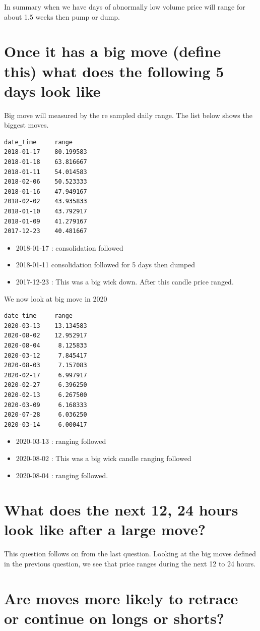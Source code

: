 In summary when we have days of abnormally low volume price will range for about 1.5 weeks then pump or dump.

\section{ Once it has a big move (define this) what does the following 5 days look like}
Big move will measured by the re sampled daily range.
The list below shows the biggest moves.
\begin{verbatim}
date_time     range
2018-01-17    80.199583
2018-01-18    63.816667
2018-01-11    54.014583
2018-02-06    50.523333
2018-01-16    47.949167
2018-02-02    43.935833
2018-01-10    43.792917
2018-01-09    41.279167
2017-12-23    40.481667
\end{verbatim}
\begin{itemize}
\item 2018-01-17 : consolidation followed
\item 2018-01-11 consolidation followed for 5 days then dumped
\item 2017-12-23 : This was a big wick down. After this candle price ranged.
\end{itemize}
We now look at big move in 2020
\begin{verbatim}
date_time     range
2020-03-13    13.134583
2020-08-02    12.952917
2020-08-04     8.125833
2020-03-12     7.845417
2020-08-03     7.157083
2020-02-17     6.997917
2020-02-27     6.396250
2020-02-13     6.267500
2020-03-09     6.168333
2020-07-28     6.036250
2020-03-14     6.000417
\end{verbatim}
\begin{itemize}
\item 2020-03-13 : ranging followed
\item 2020-08-02 : This was a big wick candle ranging followed
\item 2020-08-04 : ranging followed.
\end{itemize}

\section{ What does the next 12, 24 hours look like after a large move?}

This question follows on from the last question. Looking at the big moves defined in the previous question, we see that price ranges  during the next 12 to 24 hours. 


\section{ Are moves more likely to retrace or continue on longs or shorts?}


